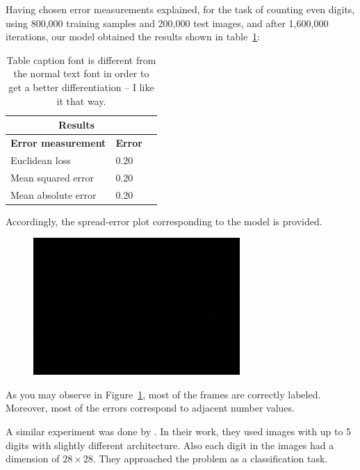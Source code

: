 \noindent Having chosen error measurements explained, for the task of counting even digits, using 800,000 training samples and 200,000 test images, and after 1,600,000 iterations, our model obtained the results shown in table~\ref{tab:res}:


\begin{table}[H]
\caption{Table caption font is different from the normal text font in order to get a better differentiation -- I like it that way.}
\label{tab:res}
\centering
\small\sffamily
\begin{tabular}{llr}
\multicolumn{2}{c}{\textbf{\textbf{Results}}} \\
\bottomrule
\textbf{Error measurement}        & \textbf{Error} \\
\bottomrule
Euclidean loss           & 0.20  \\
Mean squared error       & 0.20  \\
Mean absolute error      & 0.20  \\
\bottomrule
\end{tabular}
\end{table} 

Accordingly, the spread-error plot corresponding to the model is provided.

\begin{figure}[H]
	\centering
	{\includegraphics[width=0.7\textwidth]{images/1}}
	\caption{}
	\label{fig:splot}
\end{figure}

As you may observe in Figure~\ref{fig:splot}, most
of the frames are correctly labeled. Moreover, most of the errors correspond to adjacent number values.

\noindent A similar experiment was done by \citeauthor*{segui2015learning}. In their work, they used images with up to 5 digits with slightly different architecture. Also each digit in the images had a dimension of $28\times28$. They approached the problem as a classification task. 

